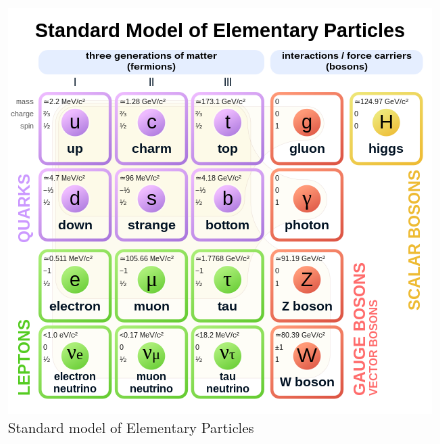 \begin{figure}
  \centering
  \includegraphics[width=0.7\linewidth]{figures/chapter1/Standard_Model_of_Elementary_Particles.svg.png}
  \caption[caption for LOF]{Standard model of Elementary Particles \footnotemark}
  \label{fig:standard_model}
\end{figure}



